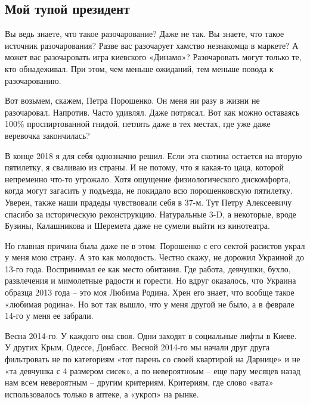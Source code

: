  
 
 

\subsection{Мой тупой президент}

Вы ведь знаете, что такое разочарование?  Даже не так. Вы знаете, что такое
источник разочарования? Разве вас разочарует хамство незнакомца в маркете? А
может вас разочаровать игра киевского «Динамо»? Разочаровать могут только те,
кто обнадеживал. При этом, чем меньше ожиданий, тем меньше повода к
разочарованию.

Вот возьмем, скажем, Петра Порошенко. Он меня ни разу в жизни не разочаровал.
Напротив. Часто удивлял. Даже потрясал. Вот как можно оставаясь 100\%
проспиртованной гнидой, петлять даже в тех местах, где уже даже веревочка
закончилась?

В конце 2018 я для себя однозначно решил. Если эта скотина остается на вторую
пятилетку, я сваливаю из страны. И не потому, что я какая-то цаца, которой
непременно что-то угрожало. Хотя ощущение физиологического дискомфорта, когда
могут загасить у подъезда, не покидало всю порошенковскую пятилетку. Уверен,
также наши прадеды чувствовали себя в 37-м. Тут Петру Алексеевичу спасибо за
историческую реконструкцию. Натуральные 3-D, а некоторые, вроде Бузины,
Калашникова и Шеремета даже не сумели выйти из кинотеатра.

Но главная причина была даже не в этом. Порошенко с его сектой расистов украл у
меня мою страну. А это как молодость. Честно скажу, не дорожил Украиной до
13-го года. Воспринимал ее как место обитания. Где работа, девчушки, бухло,
развлечения и мимолетные радости и горести. Но вдруг оказалось, что Украина
образца 2013 года – это моя Любима Родина. Хрен его знает, что вообще такое
«любимая родина». Но вот так вышло, что у меня другой не было, а в феврале
14-го у меня ее забрали.

Весна 2014-го. У каждого она своя. Одни заходят в социальные лифты в Киеве. У
других Крым, Одессе, Донбасс. Весной 2014-го мы начали друг друга фильтровать
не по категориям «тот парень со своей квартирой на Дарнице» и не «та девчушка с
4 размером сисек», а по невероятноым – еще пару месяцев назад нам всем
невероятным – другим критериям. Критериям, где слово «вата» использовалось
только в аптеке, а «укроп» на рынке.

